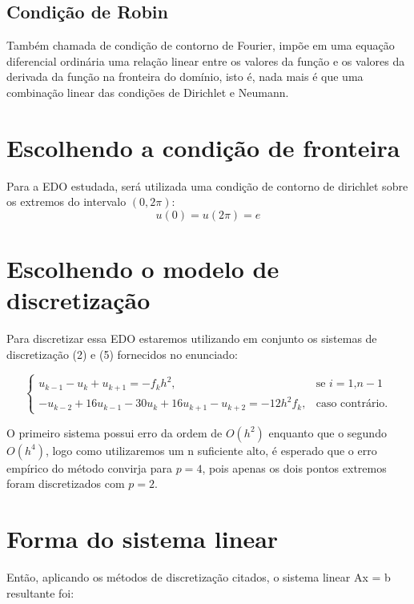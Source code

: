 \documentclass[pdftex, 12pt, a4paper]{report}
\begin{document}
\subsection{Condição de Robin}
Também chamada de condição de contorno de Fourier, impõe em uma equação diferencial ordinária uma relação linear entre os valores da função e os valores da derivada da função na fronteira do domínio, isto é, nada mais é que uma combinação linear das condições de Dirichlet e Neumann.
\section{Escolhendo a condição de fronteira}
Para a EDO estudada, será utilizada uma condição de contorno de dirichlet sobre os extremos do intervalo $(0,2\pi)$:
$$u(0) = u(2\pi) = e$$
\section{Escolhendo o modelo de discretização}
Para discretizar essa EDO estaremos utilizando em conjunto os sistemas de discretização (2) e (5) fornecidos no enunciado:

$$
       \begin{cases}

            u_{k-1} - u_{k} + u_{k+1} = -f_{k}h^{2}, & \mbox{se }i = 1  \mbox{,} n-1 \\

             -u_{k-2} + 16u_{k-1} -30u_{k} + 16u_{k+1} - u_{k+2} = -12h^{2}f_{k}, & \mbox{caso contrário.}

       \end{cases}
$$

O primeiro sistema possui erro da ordem de $O(h^{2})$ enquanto que o segundo $O(h^{4})$, logo como utilizaremos um n suficiente alto, é esperado  que o erro empírico do método convirja para $p = 4$, pois apenas os dois pontos extremos foram discretizados com $p=2$.

\section{Forma do sistema linear}
Então, aplicando os métodos de discretização citados, o sistema linear Ax = b resultante foi:
\end{document}
